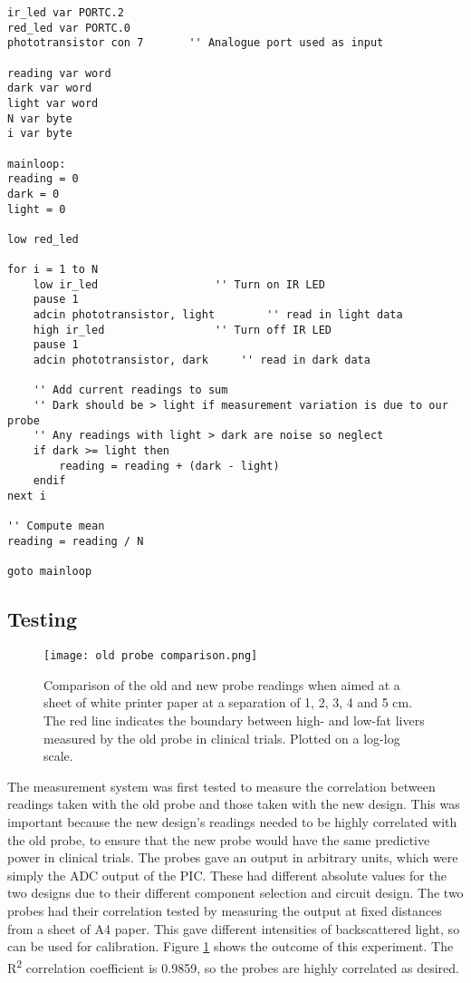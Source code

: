 \begin{lstlisting}
ir_led var PORTC.2
red_led var PORTC.0
phototransistor con 7       '' Analogue port used as input

reading var word
dark var word
light var word
N var byte
i var byte

mainloop:
reading = 0
dark = 0
light = 0

low red_led

for i = 1 to N
    low ir_led					'' Turn on IR LED
    pause 1
    adcin phototransistor, light		'' read in light data
    high ir_led					'' Turn off IR LED
    pause 1
    adcin phototransistor, dark		'' read in dark data
    
    '' Add current readings to sum
    '' Dark should be > light if measurement variation is due to our probe
    '' Any readings with light > dark are noise so neglect
    if dark >= light then
        reading = reading + (dark - light)
    endif
next i  

'' Compute mean
reading = reading / N

goto mainloop
\end{lstlisting}






\subsection{Testing}
\begin{figure}[htb]
	\centering
	\texttt{[image: old probe comparison.png]}
	\caption{Comparison of the old and new probe readings when aimed at a sheet of white printer paper at a separation of 1, 2, 3, 4 and 5 cm. The red line indicates the boundary between high- and low-fat livers measured by the old probe in clinical trials. Plotted on a log-log scale.}
	\label{fig: old probe comparison}
\end{figure}

The measurement system was first tested to measure the correlation between readings taken with the old probe and those taken with the new design. This was important because the new design's readings needed to be highly correlated with the old probe, to ensure that the new probe would have the same predictive power in clinical trials. The probes gave an output in arbitrary units, which were simply the ADC output of the PIC. These had different absolute values for the two designs due to their different component selection and circuit design. The two probes had their correlation tested by measuring the output at fixed distances from a sheet of A4 paper. This gave different intensities of backscattered light, so can be used for calibration. Figure \ref{fig: old probe comparison} shows the outcome of this experiment. The R\textsuperscript{2} correlation coefficient is 0.9859, so the probes are highly correlated as desired. \\

